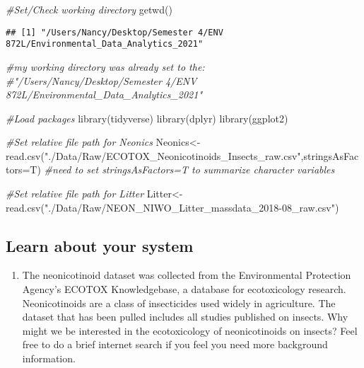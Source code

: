 \documentclass[
]{article}
\newenvironment{Shaded}{\begin{snugshade}}{\end{snugshade}}
\newcommand{\AttributeTok}[1]{\textcolor[rgb]{0.77,0.63,0.00}{#1}}
\newcommand{\CommentTok}[1]{\textcolor[rgb]{0.56,0.35,0.01}{\textit{#1}}}
\newcommand{\FunctionTok}[1]{\textcolor[rgb]{0.00,0.00,0.00}{#1}}
\newcommand{\NormalTok}[1]{#1}
\newcommand{\OtherTok}[1]{\textcolor[rgb]{0.56,0.35,0.01}{#1}}
\newcommand{\StringTok}[1]{\textcolor[rgb]{0.31,0.60,0.02}{#1}}
\providecommand{\tightlist}{%
  \setlength{\itemsep}{0pt}\setlength{\parskip}{0pt}}
\begin{document}
\begin{Shaded}
\begin{Highlighting}[]
\CommentTok{\#Set/Check working directory}
\FunctionTok{getwd}\NormalTok{() }
\end{Highlighting}
\end{Shaded}

\begin{verbatim}
## [1] "/Users/Nancy/Desktop/Semester 4/ENV 872L/Environmental_Data_Analytics_2021"
\end{verbatim}

\begin{Shaded}
\begin{Highlighting}[]
\CommentTok{\#my working directory was already set to the:}
\CommentTok{\#"/Users/Nancy/Desktop/Semester 4/ENV 872L/Environmental\_Data\_Analytics\_2021"}

\CommentTok{\#Load packages}
\FunctionTok{library}\NormalTok{(tidyverse)}
\FunctionTok{library}\NormalTok{(dplyr)}
\FunctionTok{library}\NormalTok{(ggplot2)}

\CommentTok{\#Set relative file path for Neonics}
\NormalTok{Neonics}\OtherTok{\textless{}{-}}\FunctionTok{read.csv}\NormalTok{(}\StringTok{"./Data/Raw/ECOTOX\_Neonicotinoids\_Insects\_raw.csv"}\NormalTok{,}\AttributeTok{stringsAsFactors=}\NormalTok{T)}
\CommentTok{\#need to set stringsAsFactors=T to summarize character variables}

\CommentTok{\#Set relative file path for Litter}
\NormalTok{Litter}\OtherTok{\textless{}{-}}\FunctionTok{read.csv}\NormalTok{(}\StringTok{"./Data/Raw/NEON\_NIWO\_Litter\_massdata\_2018{-}08\_raw.csv"}\NormalTok{)}
\end{Highlighting}
\end{Shaded}

\hypertarget{learn-about-your-system}{%
\subsection{Learn about your system}\label{learn-about-your-system}}

\begin{enumerate}
\def\labelenumi{\arabic{enumi}.}
\setcounter{enumi}{1}
\tightlist
\item
  The neonicotinoid dataset was collected from the Environmental
  Protection Agency's ECOTOX Knowledgebase, a database for ecotoxicology
  research. Neonicotinoids are a class of insecticides used widely in
  agriculture. The dataset that has been pulled includes all studies
  published on insects. Why might we be interested in the ecotoxicology
  of neonicotinoids on insects? Feel free to do a brief internet search
  if you feel you need more background information.
\end{enumerate}
\end{document}
